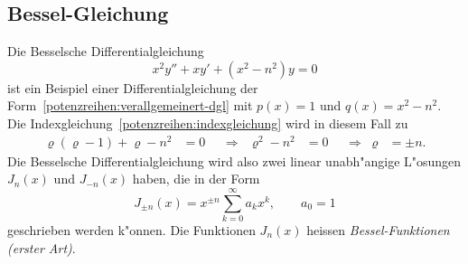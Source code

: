 \subsection{Bessel-Gleichung}
Die Besselsche Differentialgleichung
\begin{equation}
x^2y''+xy'+(x^2-n^2)y=0
\label{potenzreihen:verallgemeinert-bessel}
\end{equation}
ist ein Beispiel einer Differentialgleichung der
Form~\eqref{potenzreihen:verallgemeinert-dgl} mit
$p(x)=1$ und $q(x)=x^2-n^2$.
Die Indexgleichung~\eqref{potenzreihen:indexgleichung} wird in diesem Fall zu
\begin{equation}
\begin{aligned}
\varrho(\varrho - 1) + \varrho -n^2&=0
&&\Rightarrow&
\varrho^2-n^2&=0
&&\Rightarrow&
\varrho&=\pm n.
\end{aligned}
\label{potenzreihen:bessel-indexgleichung}
\end{equation}
Die Besselsche Differentialgleichung wird also zwei linear
unabh"angige L"osungen
$J_n(x)$ und $J_{-n}(x)$ haben, die in der Form
\[
J_{\pm n}(x)=x^{\pm n}\sum_{k=0}^\infty a_kx^k,\qquad a_0=1
\]
geschrieben werden k"onnen.
Die Funktionen $J_n(x)$ heissen {\em Bessel-Funktionen (erster Art)}.

